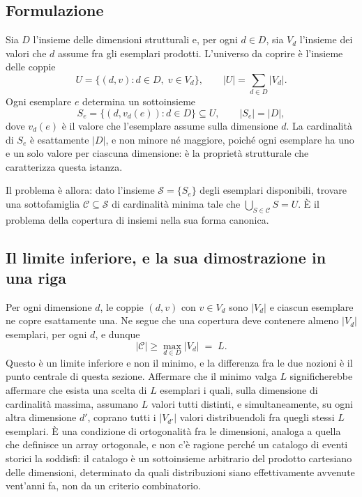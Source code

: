 \subsection*{Formulazione}

Sia $D$ l'insieme delle dimensioni strutturali e, per ogni $d \in D$, sia $V_d$ l'insieme dei valori che $d$ assume fra gli esemplari prodotti. L'universo da coprire è l'insieme delle coppie
\begin{equation}
U = \{ (d, v) : d \in D,\; v \in V_d \}, \qquad |U| = \sum_{d \in D} |V_d| .
\end{equation}
Ogni esemplare $e$ determina un sottoinsieme
\begin{equation}
S_e = \{ (d, v_d(e)) : d \in D \} \subseteq U, \qquad |S_e| = |D| ,
\end{equation}
dove $v_d(e)$ è il valore che l'esemplare assume sulla dimensione $d$. La cardinalità di $S_e$ è esattamente $|D|$, e non minore né maggiore, poiché ogni esemplare ha uno e un solo valore per ciascuna dimensione: è la proprietà strutturale che caratterizza questa istanza.

Il problema è allora: dato l'insieme $\mathcal{S} = \{S_e\}$ degli esemplari disponibili, trovare una sottofamiglia $\mathcal{C} \subseteq \mathcal{S}$ di cardinalità minima tale che $\bigcup_{S \in \mathcal{C}} S = U$. È il problema della copertura di insiemi nella sua forma canonica.

\subsection*{Il limite inferiore, e la sua dimostrazione in una riga}

Per ogni dimensione $d$, le coppie $(d, v)$ con $v \in V_d$ sono $|V_d|$ e ciascun esemplare ne copre esattamente una. Ne segue che una copertura deve contenere almeno $|V_d|$ esemplari, per ogni $d$, e dunque
\begin{equation}
|\mathcal{C}| \geq \max_{d \in D} |V_d| \;=\; L .
\end{equation}
Questo è un limite inferiore e non il minimo, e la differenza fra le due nozioni è il punto centrale di questa sezione. Affermare che il minimo valga $L$ significherebbe affermare che esista una scelta di $L$ esemplari i quali, sulla dimensione di cardinalità massima, assumano $L$ valori tutti distinti, e simultaneamente, su ogni altra dimensione $d'$, coprano tutti i $|V_{d'}|$ valori distribuendoli fra quegli stessi $L$ esemplari. È una condizione di ortogonalità fra le dimensioni, analoga a quella che definisce un array ortogonale, e non c'è ragione perché un catalogo di eventi storici la soddisfi: il catalogo è un sottoinsieme arbitrario del prodotto cartesiano delle dimensioni, determinato da quali distribuzioni siano effettivamente avvenute vent'anni fa, non da un criterio combinatorio.

